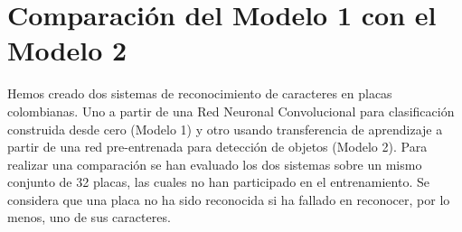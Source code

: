\section{Comparación del Modelo 1 con el Modelo 2}

Hemos creado dos sistemas de reconocimiento de caracteres en placas colombianas. Uno a partir de una Red Neuronal Convolucional para clasificación construida desde cero (Modelo 1) y otro usando transferencia de aprendizaje a partir de una red pre-entrenada para detección de objetos (Modelo 2). Para realizar una comparación se han evaluado los dos sistemas sobre un mismo conjunto de 32 placas, las cuales no han participado en el entrenamiento. Se considera que una placa no ha sido reconocida si ha fallado en reconocer, por lo menos, uno de sus caracteres.


{\centering
\begin{table}[H]
    \begin{center}
    \centering
\end{center}
\end{table}}
